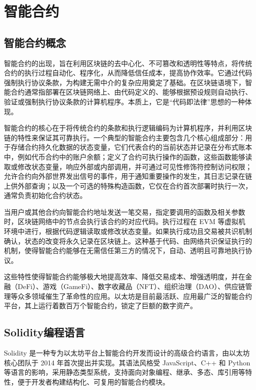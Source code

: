 \documentclass[print, master, vlined, timesmath]{DissertUESTC}
\begin{document}
\section{智能合约}


\subsection{智能合约概念}
智能合约的出现，旨在利用区块链的去中心化、不可篡改和透明性等特点，将传统合约的执行过程自动化、程序化，从而降低信任成本，提高协作效率\cite{}。它通过代码强制执行协议条款，为构建无需中介的复杂应用奠定了基础\cite{}。在区块链语境下，智能合约通常指部署在区块链网络上、由代码定义的、能够根据预设规则自动执行、验证或强制执行协议条款的计算机程序。本质上，它是“代码即法律”思想的一种体现\cite{}。

智能合约的核心在于将传统合约的条款和执行逻辑编码为计算机程序，并利用区块链的特性来保证其可靠执行。一个典型的智能合约主要包含几个核心组成部分：用于存储合约持久化数据的状态变量，它们代表合约的当前状态并记录在分布式账本中，例如代币合约中的账户余额；定义了合约可执行操作的函数，这些函数能够读取或修改状态变量，响应外部或内部调用，并可通过可见性修饰符控制访问权限；允许合约向外部世界发出信号的事件，用于通知重要操作的发生，其日志记录在链上供外部查询；以及一个可选的特殊构造函数，它仅在合约首次部署时执行一次，通常负责初始化合约状态。

当用户或其他合约向智能合约地址发送一笔交易，指定要调用的函数及相关参数时，区块链网络中的节点会执行该合约的对应代码。执行过程在 EVM 等虚拟机环境中进行，根据代码逻辑读取或修改状态变量。如果执行成功且交易被共识机制确认，状态的改变将永久记录在区块链上。这种基于代码、由网络共识保证执行的机制，使得智能合约能够在无需信任第三方的情况下，自动、透明且可靠地执行协议。

这些特性使得智能合约能够极大地提高效率、降低交易成本、增强透明度，并在金融（DeFi）\cite{}、游戏（GameFi）\cite{}、数字收藏品（NFT）\cite{}、组织治理（DAO）\cite{}、供应链管理\cite{}等众多领域催生了革命性的应用。以太坊是目前最活跃、应用最广泛的智能合约平台，其上运行着数百万个智能合约，锁定了巨额的数字资产\cite{}。

\subsection{Solidity编程语言}

Solidity 是一种专为以太坊平台上智能合约开发而设计的高级合约语言，由以太坊核心团队于 2014 年首次提出并实现\cite{}。其语法风格受 JavaScript、C++ 和 Python 等语言的影响\cite{}，采用静态类型系统，支持面向对象编程、继承、多态、库引用等特性，便于开发者构建结构化、可复用的智能合约模块。
\end{document}
